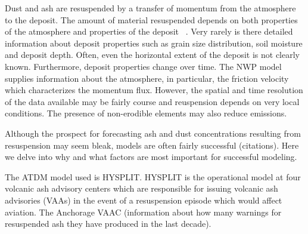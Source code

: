\documentclass[draft]{agujournal2018}
\begin{document}
Dust and ash are resuspended
by a transfer of momentum from the atmosphere to the deposit. The amount of material resuspended
depends on both properties of the atmosphere and properties of the deposit ~\citep{Kok12}. 
Very rarely is there detailed information about deposit properties such as grain size distribution, soil moisture and deposit depth.
Often, even the horizontal extent of the deposit is not clearly known. 
Furthermore, deposit properties change over time. 
The NWP model supplies information about the atmosphere, in particular, the friction velocity which characterizes
the momentum flux. However, the spatial and time resolution of the data available may be fairly course and
reuspension depends on very local conditions. The presence of non-erodible elements may also reduce emissions.

Although the prospect for forecasting ash and dust concentrations resulting from resuspension may seem bleak, models are often
fairly successful (citations). Here we delve into why and what factors are most important for successful modeling.

The ATDM model used is HYSPLIT. HYSPLIT is the operational model
at four volcanic ash advisory centers which are responsible for issuing volcanic ash advisories (VAAs) in the event of
a resuspension episode which would affect aviation.
The Anchorage VAAC (information about how many warnings for resuspended ash they have produced in the last decade).





\end{document}

